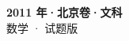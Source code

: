 \documentclass[zihao=-4, a4paper]{ctexart}
\begin{document}
\begin{center}
  {\Large\bfseries 2011 年·北京卷·文科}\\[4pt]
  {\large 数学 · 试题版}
\end{center}
\medskip
{}

\end{document}
